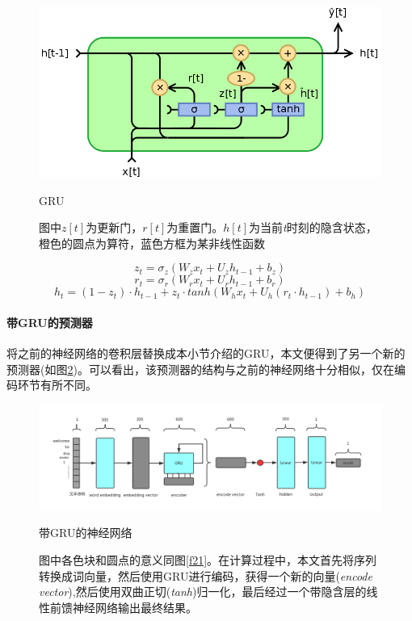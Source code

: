 \begin{figure}[htb]
    \centering
    \includegraphics[width=11.5cm]{GRU.png}
    \caption{GRU}
    \captionsetup{font=footnotesize,margin=30pt}\caption*{图中\(z[t]\)为更新门，\(r[t]\)为重置门。\(h[t]\)为当前\textit{t}时刻的隐含状态，橙色的圆点为算符，蓝色方框为某非线性函数}
    \label{f22}
\end{figure}

\begin{equation}\label{3-9}
z_t=\sigma_z(W_zx_t+U_zh_{t-1}+b_z) 
\end{equation}
\begin{equation}\label{3-10}
r_t=\sigma_r(W_rx_t+U_rh_{t-1}+b_r) 
\end{equation}
\begin{equation}\label{3-11}
h_t=(1-z_t)\cdot h_{t-1}+z_t\cdot tanh(W_hx_t+U_h(r_t\cdot h_{t-1})+b_h)
\end{equation}

\paragraph{带GRU的预测器}
将之前的神经网络的卷积层替换成本小节介绍的GRU，本文便得到了另一个新的预测器(如图\ref{f23})。可以看出，该预测器的结构与之前的神经网络十分相似，仅在编码环节有所不同。

\begin{figure}[htb]
    \centering
    \includegraphics[width=16cm]{gru_ranker.png}
    \caption{带GRU的神经网络}
    \captionsetup{font=footnotesize,margin=30pt}\caption*{图中各色块和圆点的意义同图\ref{f21}。在计算过程中，本文首先将序列转换成词向量，然后使用GRU进行编码，获得一个新的向量(\textit{encode vector}),然后使用双曲正切(\textit{tanh})归一化，最后经过一个带隐含层的线性前馈神经网络输出最终结果。}
    \label{f23}
\end{figure}
